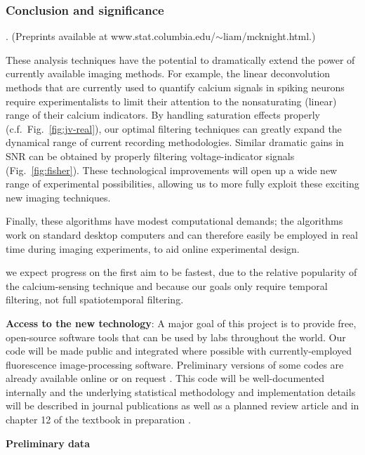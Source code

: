 \documentclass[12pt]{article}
\begin{document}
\subsubsection*{Conclusion and significance}

\cite{HAP06,Vogelstein07,HP06,PAN07}.  (Preprints available at
www.stat.columbia.edu/$\sim$liam/mcknight.html.)


These analysis techniques have the
potential to dramatically extend the power of currently available
imaging methods.  For example, the linear deconvolution methods that
are currently used to quantify calcium signals in spiking neurons
require experimentalists to limit their attention to the nonsaturating
(linear) range of their calcium indicators.  By handling saturation
effects properly (c.f.\ Fig.~\ref{fig:jv-real}), our optimal filtering
techniques can greatly expand the dynamical range of current recording
methodologies.  Similar dramatic gains in SNR can be obtained by
properly filtering voltage-indicator signals (Fig.~\ref{fig:fisher}).
These technological improvements will open up a wide new range of
experimental possibilities, allowing us to more fully exploit these
exciting new imaging techniques.

Finally, these algorithms have modest
computational demands; the algorithms work on standard desktop
computers and can therefore easily be employed in real time during
imaging experiments, to aid online experimental design.

we expect progress on the first aim to be fastest, due to the relative
popularity of the calcium-sensing technique and because our goals only
require temporal filtering, not full spatiotemporal filtering.


\noindent \textbf{Access to the new technology}: A major goal of this
project is to provide free, open-source software tools that can be
used by labs throughout the world.  Our code will be made public and
integrated where possible with currently-employed fluorescence
image-processing software.  Preliminary versions of some codes are
already available online or on request
\cite{HAP06,HP06,Vogelstein07,Vogelstein08}.  This code will be
well-documented internally and the underlying statistical methodology
and implementation details will be described in journal publications
as well as a planned review article and in chapter 12 of the textbook
in preparation \cite{PanBook}.


\clearpage
\pagestyle{empty}

\noindent \textbf{Preliminary data}
\end{document}

